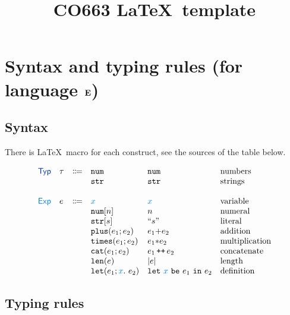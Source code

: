 \documentclass[11pt]{article}
\begin{document}
\title{CO663 \LaTeX\ template}

\date{\vspace{-5ex}}
\maketitle


\newcommand{\answerbox}[1]{\framebox{\parbox[c][#1]{\textwidth}{
      \color{white}{h}%
    }}}



\section{Syntax and typing rules (for language $\textbf{E}$)}


\subsection{Syntax}

There is \LaTeX\ macro for each construct, see the sources of the
table below.

  \[
  \begin{array}{llclll}
    \TYPES & \tau & \Coloneqq & \enum{}  & \enum{} & \text{numbers}
    \\
           &&& \estr{} & \estr{} & \text{strings}
    \\
    \\ 
    \EXPS & e & \Coloneqq  & \var{x} & \var{x} & \text{variable}
    \\
           &&& \enum{n} & n & \text{numeral}
    \\
           &&& \estr{s} & \litstr{s} & \text{literal}
    \\
           &&& \eplus{e_1}{e_2} & e_1 {+} e_2 & \text{addition}
    \\
           &&& \etimes{e_1}{e_2} & e_1 {*} e_2 & \text{multiplication}
    \\
           &&& \ecat{e_1}{e_2} & e_1 \concat e_2 & \text{concatenate}
    \\
           &&& \elen{e} & \lvert e \rvert & \text{length}
    \\
           &&& \elet{e_1}{x}{e_2} & \clet{e_1}{x}{e_2} & \text{definition}
  \end{array}
  \]
\subsection{Typing rules}
\end{document}
